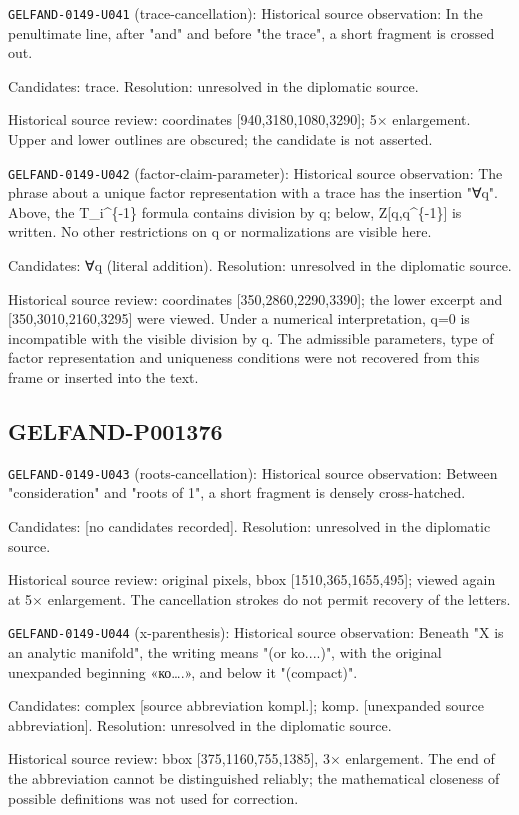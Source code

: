 \noindent\texttt{GELFAND-0149-U041} (trace-cancellation): Historical source observation: In the penultimate line, after "and" and before "the trace", a short fragment is crossed out.\par
Candidates: trace. Resolution: unresolved in the diplomatic source.\par
Historical source review: coordinates [940,3180,1080,3290]; 5× enlargement. Upper and lower outlines are obscured; the candidate is not asserted.\par

\noindent\texttt{GELFAND-0149-U042} (factor-claim-parameter): Historical source observation: The phrase about a unique factor representation with a trace has the insertion "∀q". Above, the T\_i\textasciicircum{}\{-1\} formula contains division by q; below, Z[q,q\textasciicircum{}\{-1\}] is written. No other restrictions on q or normalizations are visible here.\par
Candidates: ∀q (literal addition). Resolution: unresolved in the diplomatic source.\par
Historical source review: coordinates [350,2860,2290,3390]; the lower excerpt and [350,3010,2160,3295] were viewed. Under a numerical interpretation, q=0 is incompatible with the visible division by q. The admissible parameters, type of factor representation and uniqueness conditions were not recovered from this frame or inserted into the text.\par

\subsection*{GELFAND-P001376}
\noindent\texttt{GELFAND-0149-U043} (roots-cancellation): Historical source observation: Between "consideration" and "roots of 1", a short fragment is densely cross-hatched.\par
Candidates: [no candidates recorded]. Resolution: unresolved in the diplomatic source.\par
Historical source review: original pixels, bbox [1510,365,1655,495]; viewed again at 5× enlargement. The cancellation strokes do not permit recovery of the letters.\par

\noindent\texttt{GELFAND-0149-U044} (x-parenthesis): Historical source observation: Beneath "X is an analytic manifold", the writing means "(or ko....)", with the original unexpanded beginning «ко….», and below it "(compact)".\par
Candidates: complex [source abbreviation kompl.]; komp. [unexpanded source abbreviation]. Resolution: unresolved in the diplomatic source.\par
Historical source review: bbox [375,1160,755,1385], 3× enlargement. The end of the abbreviation cannot be distinguished reliably; the mathematical closeness of possible definitions was not used for correction.\par

